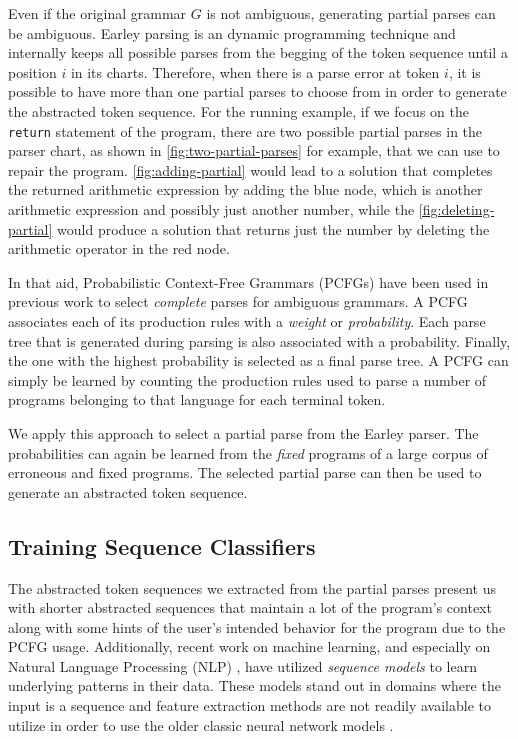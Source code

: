 Even if the original grammar $G$ is
not ambiguous, generating partial parses can be ambiguous. Earley parsing is an
dynamic programming technique and internally keeps all possible parses from the
begging of the token sequence until a position $i$ in its charts. Therefore,
when there is a parse error at token $i$, it is possible to have more than one
partial parses to choose from in order to generate the abstracted token
sequence. For the running example, if we focus on the \texttt{return} statement
of the program, there are two possible partial parses in the parser chart, as
shown in \autoref{fig:two-partial-parses} for example, that we can use to repair
the program. \autoref{fig:adding-partial} would lead to a solution that
completes the returned arithmetic expression by adding the blue node, which is
another arithmetic expression and possibly just another number, while the
\autoref{fig:deleting-partial} would produce a solution that returns just the
number by deleting the arithmetic operator in the red node.

In that aid, Probabilistic Context-Free Grammars (PCFGs) have been used in
previous work \citep{Collins_2013, Jelinek_1992} to select \emph{complete}
parses for ambiguous grammars. A PCFG associates each of its production rules
with a \emph{weight} or \emph{probability}. Each parse tree that is generated
during parsing is also associated with a probability. Finally, the one with the
highest probability is selected as a final parse tree. A PCFG can simply be
learned \citep{Collins_2013} by counting the production rules used to parse a
number of programs belonging to that language for each terminal token.

We apply this approach to select a partial parse from the Earley parser. The
probabilities can again be learned from the \emph{fixed} programs of a large
corpus of erroneous and fixed programs. The selected partial parse can then be
used to generate an abstracted token sequence.


\subsection{Training Sequence Classifiers}
\label{sec:overview:train}
The abstracted token sequences we extracted from the partial parses present us
with shorter abstracted sequences that maintain a lot of the program's context
along with some hints of the user's intended behavior for the program due to the
PCFG usage. Additionally, recent work on machine learning, and especially on
Natural Language Processing (NLP) \citep{Sutskever_2014, Hardalov_2018}, have
utilized \emph{sequence models} to learn underlying patterns in their data.
These models stand out in domains where the input is a sequence and feature
extraction methods are not readily available to utilize in order to use the
older classic neural network models \citep{Sutskever_2014}.

